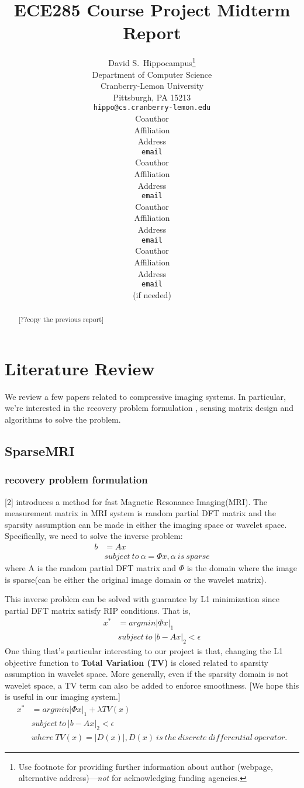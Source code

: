 \documentclass{article} %
\title{ECE285 Course Project Midterm Report}
\author{
David S.~Hippocampus\thanks{ Use footnote for providing further information
about author (webpage, alternative address)---\emph{not} for acknowledging
funding agencies.} \\
Department of Computer Science\\
Cranberry-Lemon University\\
Pittsburgh, PA 15213 \\
\texttt{hippo@cs.cranberry-lemon.edu} \\
\And
Coauthor \\
Affiliation \\
Address \\
\texttt{email} \\
\AND
Coauthor \\
Affiliation \\
Address \\
\texttt{email} \\
\And
Coauthor \\
Affiliation \\
Address \\
\texttt{email} \\
\And
Coauthor \\
Affiliation \\
Address \\
\texttt{email} \\
(if needed)\\
}
\begin{document}
\maketitle

\begin{abstract}
[??copy the previous report]
\end{abstract}

\section{Literature Review}
We review a few papers related to compressive imaging systems. In particular, we're interested in the recovery problem formulation , sensing matrix design and algorithms to solve the problem.
\subsection{SparseMRI}
\subsubsection{recovery problem formulation}
[2] introduces a method for fast Magnetic Resonance Imaging(MRI). The measurement matrix in MRI system is random partial DFT matrix and the sparsity assumption can be made in either the imaging space or wavelet space. Specifically, we need to solve the inverse problem:
\begin{align*}
b&=A x \\
&subject~to~ \alpha=\Phi x,\alpha~is~sparse
\end{align*}
where A is the random partial DFT matrix and $\Phi$ is the domain where the image is sparse(can be either the original image domain or the wavelet matrix).

This inverse problem can be solved with guarantee by L1 minimization since partial DFT matrix satisfy RIP conditions. That is,
\begin{align*}
x^*&=argmin |\Phi x|_1 \\
&subject~to~|b-Ax|_2<\epsilon
\end{align*}
One thing that's particular interesting to our project is that, changing the L1 objective function to \textbf{Total Variation (TV)} is closed related to sparsity assumption in wavelet space. More generally, even if the sparsity domain is not wavelet space, a TV term can also be added to enforce smoothness. [We hope this is useful in our imaging system.]
\begin{align*}
x^*&=argmin |\Phi x|_1+\lambda TV(x) \\
&subject~to~|b-Ax|_2<\epsilon\\
&where~TV(x)=|D(x)|, D(x)~ is~ the~discrete~differential~operator. 
\end{align*}
\end{document}
